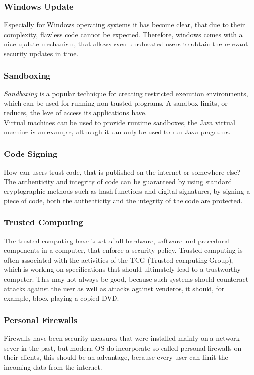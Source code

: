 \documentclass[a4paper, 10 pt, conference]{ieeeconf}
\begin{document}
\vspace{0.5cm}
\subsubsection{\textbf{Windows Update}}
Especially for Windows operating systems it has become clear, that due to their complexity, flawless code cannot be expected. Therefore, windows comes with a nice update mechanism, that allows even uneducated users to obtain the relevant security updates in time. 
\vspace{0.5cm}
\subsubsection{\textbf{Sandboxing}}
\emph{Sandboxing} is a popular technique for creating restricted execution environments, which can be used for running non-trusted programs. A sandbox limits, or reduces, the leve of access its applications have. \\
Virtual machines can be used to provide runtime sandboxes, the Java virtual machine is an example, although it can only be used to run Java programs. 
\vspace{0.5cm}
\subsubsection{\textbf{Code Signing}}
How can users trust code, that is published on the internet or somewhere else?
The authenticity and integrity of code can be guaranteed by using standard cryptographic methods such as hash functions and digital signatures, by signing a piece of code, both the authenticity and the integrity of the code are protected.
\vspace{0.5cm}
\subsubsection{\textbf{Trusted Computing}}
The trusted computing base is set of all hardware, software and procedural components in a computer, that enforce a security policy. Trusted computing is often associated with the activities of the TCG (Trusted computing Group), which is working on specifications that should ultimately lead to a trustworthy computer. This may not always be good, because such systems should counteract attacks against the user as well as attacks against venderos, it should, for example, block playing a copied DVD. 
\vspace{0.5cm}
\subsubsection{\textbf{Personal Firewalls}}
Firewalls have been security measures that were installed mainly on a network sever in the past, but modern OS do incorporate so-called personal firewalls on their clients, this should be an advantage, because every user can limit the incoming data from the internet. 
\vspace{0.5cm}
\end{document}
